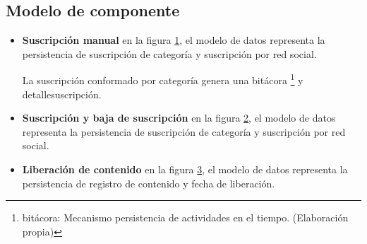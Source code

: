\subsection{Modelo de componente}

\begin{itemize}

\item \textbf{Suscripción manual} 
en la figura \ref{fig:Modelo de datos para suscripción de usuario}, el modelo de datos
representa la persistencia de suscripción de categoría y suscripción por
red social.

\begin{figure}[!ht]
	\centering
	\label{fig:Modelo de datos para suscripción de usuario}
\end{figure}

La suscripción conformado por categoría genera una bitácora \footnote{bitácora:
Mecanismo persistencia de actividades en el tiempo. (Elaboración propia)}
y detalle\textunderscore suscripción.

\item \textbf{Suscripción y baja de suscripción}
en la figura \ref{fig:Modelo de datos para suscriptor}, el modelo de datos
representa la persistencia de suscripción de categoría y suscripción por
red social.

\begin{figure}[!ht]
	\centering
	\label{fig:Modelo de datos para suscriptor}
\end{figure}

\item \textbf{Liberación de contenido}
en la figura \ref{fig:Modelo de datos para liberación de contenido},
el modelo de datos representa la persistencia de registro de contenido
y fecha de liberación.

\begin{figure}[!ht]
	\centering
	\label{fig:Modelo de datos para liberación de contenido}
\end{figure}


\end{itemize}


